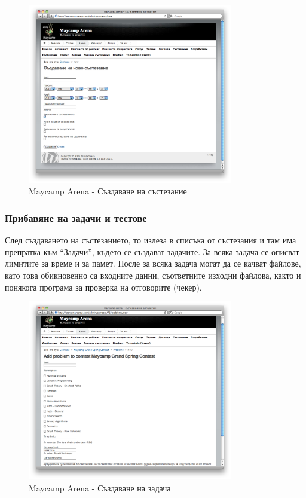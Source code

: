 \documentclass[a4paper,12pt]{article}
\begin{document}
  \begin{figure}[ht]
    \begin{center}
      \includegraphics[width=0.8\textwidth]{maycamp_arena_admin_contest.png}
    \end{center}
    \caption{Maycamp Arena - Създаване на състезание}
    \label{arena_admin_contest}
  \end{figure}
  
  \subsubsection{Прибавяне на задачи и тестове}
  
  След създаването на състезанието, то излеза в списъка от състезания и там има препратка към ``Задачи'', където се създават задачите. За всяка задача се описват лимитите за време и за памет. После за всяка задача могат да се качват файлове, като това обикновенно са входните данни, съответните изходни файлова, както и понякога програма за проверка на отговорите (чекер).

  \begin{figure}[ht]
    \begin{center}
      \includegraphics[width=0.8\textwidth]{maycamp_arena_admin_problem.png}
    \end{center}
    \caption{Maycamp Arena - Създаване на задача}
    \label{arena_admin_problem}
  \end{figure}
  
\end{document}
